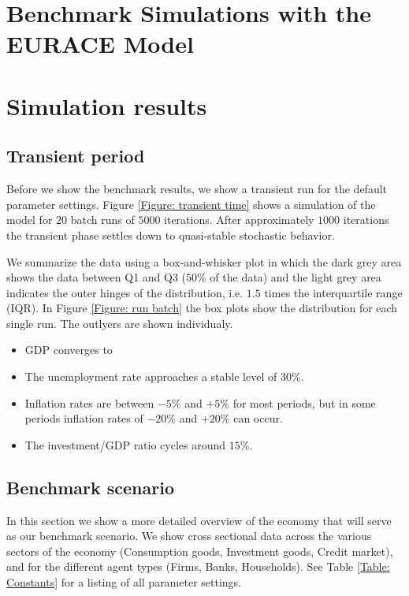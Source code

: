 \documentclass{article}
\begin{document}
\section{Benchmark Simulations with the EURACE Model}


\section{Simulation results}

\subsection{Transient period}
Before we show the benchmark results, we show a transient run for the default parameter settings.
Figure \ref{Figure: transient time} shows a simulation of the model for $20$ batch runs of $5000$ iterations.
After approximately $1000$ iterations the transient phase settles down to quasi-stable stochastic behavior.

We summarize the data using a box-and-whisker plot in which the dark grey area shows the data between Q1 and Q3 ($50\%$ of the data) and
 the light grey area indicates the outer hinges of the distribution, i.e. $1.5$ times the interquartile range (IQR).
In Figure \ref{Figure: run batch} the box plots show the distribution for each single run.
The outlyers are shown individualy.

\begin{itemize}
\item GDP converges to 
\item The unemployment rate approaches a stable level of $30\%$.
\item Inflation rates are between $-5\%$ and $+5\%$ for most periods,
 but in some periods inflation rates of $-20\%$ and $+20\%$ can occur.
\item The investment/GDP ratio cycles around $15\%$.
\end{itemize}

\subsection{Benchmark scenario}
In this section we show a more detailed overview of the economy that will serve as our benchmark scenario.
We show cross sectional data across the various sectors of the economy (Consumption goods, Investment goods, Credit market),
and for the different agent types (Firms, Banks, Households). 
See Table \ref{Table: Constants} for a listing of all parameter settings.
\end{document}
